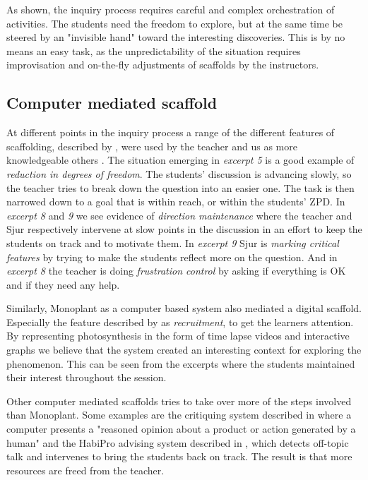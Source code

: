 As shown, the inquiry process requires careful and complex orchestration of activities. The students need the freedom to explore, but at the same time be steered by an "invisible hand" toward the interesting discoveries. This is by no means an easy task, as the unpredictability of the situation requires improvisation and on-the-fly adjustments of scaffolds by the instructors.  

\subsection{Computer mediated scaffold}
At different points in the inquiry process a range of the different features of scaffolding, described by \citet{wood1976role}, were used by the teacher and us as more knowledgeable others \citep{vygotskiui1978mind}. The situation emerging in \emph{excerpt 5} is a good example of \emph{reduction in degrees of freedom}. The students' discussion is advancing slowly, so the teacher tries to break down the question into an easier one. The task is then narrowed down to a goal that is within reach, or within the students' ZPD. In \emph{excerpt 8} and \emph{9} we see evidence of \emph{direction maintenance} where the teacher and Sjur respectively intervene at slow points in the discussion in an effort to keep the students on track and to motivate them. In \emph{excerpt 9} Sjur is \emph{marking critical features} by trying to make the students reflect more on the question. And in \emph{excerpt 8} the teacher is doing \emph{frustration control} by asking if everything is OK and if they need any help. 

Similarly, Monoplant as a computer based system also mediated a digital scaffold. Especially the feature described by \citet{wood1976role} as \emph{recruitment}, to get the learners attention. By representing photosynthesis in the form of time lapse videos and interactive graphs we believe that the system created an interesting context for exploring the phenomenon. This can be seen from the excerpts where the students maintained their interest throughout the session.

Other computer mediated scaffolds tries to take over more of the steps involved than Monoplant. Some examples are the critiquing system described in \citet{fischer1991critics} where a computer presents a "reasoned opinion about a product or action generated by a human" and the HabiPro advising system described in \citet{soller2005mirroring}, which detects off-topic talk and intervenes to bring the students back on track. The result is that more resources are freed from the teacher.

